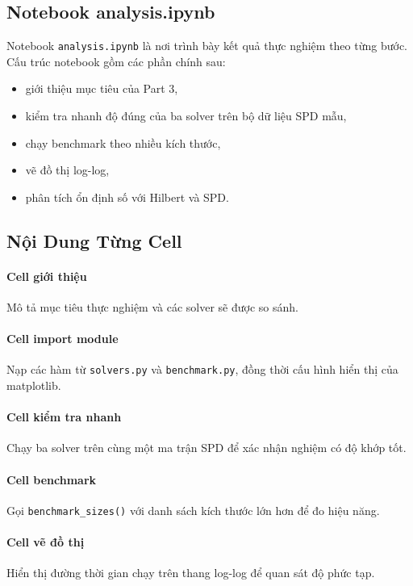 \documentclass[12pt, a4paper, twoside]{article}
\begin{document}
\subsection{Notebook analysis.ipynb}

Notebook \texttt{analysis.ipynb} là nơi trình bày kết quả thực nghiệm theo từng bước. Cấu trúc notebook gồm các phần chính sau:
\begin{itemize}
    \item giới thiệu mục tiêu của Part 3,
    \item kiểm tra nhanh độ đúng của ba solver trên bộ dữ liệu SPD mẫu,
    \item chạy benchmark theo nhiều kích thước,
    \item vẽ đồ thị log-log,
    \item phân tích ổn định số với Hilbert và SPD.
\end{itemize}

\subsection{Nội Dung Từng Cell}

\paragraph{Cell giới thiệu}
Mô tả mục tiêu thực nghiệm và các solver sẽ được so sánh.

\paragraph{Cell import module}
Nạp các hàm từ \texttt{solvers.py} và \texttt{benchmark.py}, đồng thời cấu hình hiển thị của matplotlib.

\paragraph{Cell kiểm tra nhanh}
Chạy ba solver trên cùng một ma trận SPD để xác nhận nghiệm có độ khớp tốt.

\paragraph{Cell benchmark}
Gọi \texttt{benchmark\_sizes()} với danh sách kích thước lớn hơn để đo hiệu năng.

\paragraph{Cell vẽ đồ thị}
Hiển thị đường thời gian chạy trên thang log-log để quan sát độ phức tạp.
\end{document}
